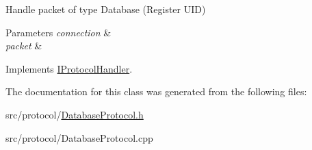 Handle packet of type Database (Register U\-I\-D) 


\begin{DoxyParams}{Parameters}
{\em connection} & \\
\hline
{\em packet} & \\
\hline
\end{DoxyParams}


Implements \hyperlink{class_i_protocol_handler_abcdcfa563b512a954b08bee298e6e1ed}{I\-Protocol\-Handler}.



The documentation for this class was generated from the following files\-:\begin{DoxyCompactItemize}
\item 
src/protocol/\hyperlink{_database_protocol_8h}{Database\-Protocol.\-h}\item 
src/protocol/Database\-Protocol.\-cpp\end{DoxyCompactItemize}
